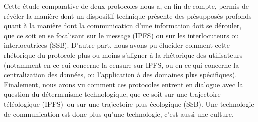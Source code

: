 \documentclass{article}
\begin{document}
Cette étude comparative de deux protocoles nous a, en fin de compte, permis de révéler la manière dont un dispositif technique présente des présupposés profonds quant à la manière dont la communication d'une information doit se dérouler, que ce soit en se focalisant sur le message (IPFS) ou sur les interlocuteurs ou interlocutrices (SSB). D'autre part, nous avons pu élucider comment cette rhétorique du protocole plus ou moins s'aligner à la rhétorique des utilisateurs (notamment en ce qui concerne la censure sur IPFS, ou en ce qui concerne la centralization des données, ou l'application à des domaines plus spécifiques). Finalement, nous avons vu comment ces protocoles entrent en dialogue avec la question du déterminisme technologique, que ce soit sur une trajectoire téléologique (IPFS), ou sur une trajectoire plus écologique (SSB). Une technologie de communication est donc plus qu'une technologie, c'est aussi une culture.

\pagebreak



\end{document}
